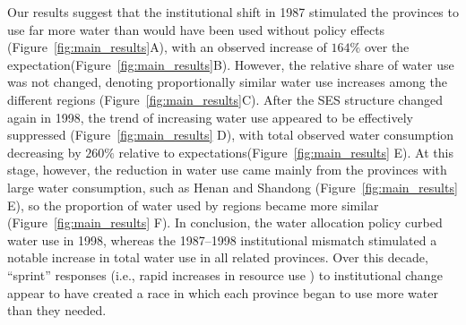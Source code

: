 
Our results suggest that the institutional shift in 1987 stimulated the provinces to use far more water than would have been used without policy effects (Figure~\ref{fig:main_results}A), with an observed increase of $164\%$ over the expectation(Figure~\ref{fig:main_results}B).
However, the relative share of water use was not changed, denoting proportionally similar water use increases among the different regions (Figure~\ref{fig:main_results}C).
After the SES structure changed again in 1998, the trend of increasing water use appeared to be effectively suppressed (Figure~\ref{fig:main_results} D), with total observed water consumption decreasing by $260\%$ relative to expectations(Figure~\ref{fig:main_results} E).
At this stage, however, the reduction in water use came mainly from the provinces with large water consumption, such as Henan and Shandong (Figure~\ref{fig:main_results} E),  so the proportion of water used by regions became more similar (Figure~\ref{fig:main_results} F).
In conclusion, the water allocation policy curbed water use in 1998, whereas the 1987–1998 institutional mismatch stimulated a notable increase in total water use in all related provinces.
Over this decade, “sprint” responses (i.e., rapid increases in resource use \cite{lueckPreemptiveHabitatDestruction2003}) to institutional change appear to have created a race in which each province began to use more water than they needed.
